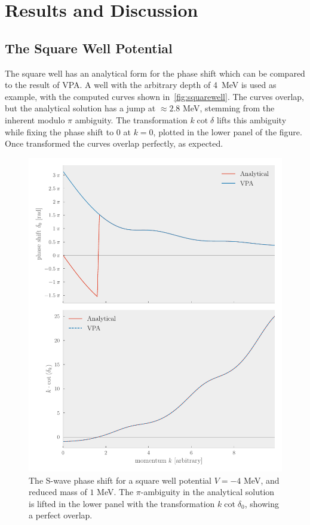 \section{Results and Discussion}\label{sec:Results}

\subsection{The Square Well Potential}
The square well has an analytical form for the phase shift which can be compared
to the result of VPA. A well with the arbitrary depth of \SI{4}{MeV} is used as
example, with the computed curves shown in~\cref{fig:squarewell}. The curves
overlap, but the analytical solution
has a jump at \(\approx 2.8\) MeV, stemming from the inherent modulo \(\pi\)
ambiguity. The transformation \(k\cot\delta\) lifts this ambiguity while fixing
the phase shift to \(0\) at \(k=0\), plotted in the lower panel of the figure.
Once transformed the curves overlap perfectly, as expected.

\begin{figure}[ht!]
  \showthe\columnwidth %
  \showthe\textwidth %
  \centering
  \includegraphics[]{Figures/analytical_cot.pdf}
  \caption{\label{fig:analyticalcot}The S-wave phase shift for a square well
    potential \(V=-4\) MeV, and reduced mass of \(1\) MeV. The \(\pi\)-ambiguity
  in the analytical solution is lifted in the lower panel with the
  transformation \(k\cot{\delta_{0}}\), showing a perfect overlap.}
\end{figure}

